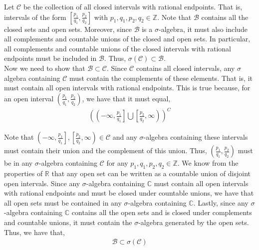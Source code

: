 \documentclass[12pt]{article}
\newenvironment{problem}[2][Problem]{\begin{trivlist}
\item[\hskip \labelsep {\bfseries #1}\hskip \labelsep {\bfseries #2.}]}{\end{trivlist}}
\begin{document}
\begin{problem}{5}
\end{problem}

Let $\mathcal{C}$ be the collection of all closed intervals with rational endpoints. That is, intervals of the form $\left[ \frac{p_1}{q_1}, \frac{p_2}{q_2} \right]$ with $p_1, q_1, p_2, q_2 \in \mathbb{Z}$. Note that $\mathcal{B}$ contains all the closed sets and open sets. Moreover, since $\mathcal{B}$ is a $\sigma$-algebra, it must also include all complements and countable unions of the closed and open sets. In particular, all complements and countable unions of the closed intervals with rational endpoints must be included in $\mathcal{B}$. Thus, $\sigma(\mathcal{C}) \subset \mathcal{B}$.\\

Now we need to show that $\mathcal{B} \subset \mathcal{C}$. Since $\mathcal{C}$ contains all closed intervals, any $\sigma$ algebra containing $\mathcal{C}$ must contain the complements of these elements. That is, it must contain all open intervals with rational endpoints. This is true because, for an open interval $\left( \frac{p_1}{q_1}, \frac{p_2}{q_2} \right)$, we have that it must equal,
\begin{align*}
\left(\left(-\infty, \frac{p_1}{q_1}\right] \bigcup \left[\frac{p_2}{q_2}, \infty\right)\right)^C
\end{align*}

Note that $\left(-\infty, \frac{p_1}{q_1}\right], \left[\frac{p_2}{q_2}, \infty\right) \in \mathcal{C}$ and any $\sigma$-algebra containing these intervals must contain their union and the complement of this union. Thus, $\left( \frac{p_1}{q_1}, \frac{p_2}{q_2} \right)$ must be in any $\sigma$-algebra containing $\mathcal{C}$ for any $p_1, q_1, p_2, q_2 \in \mathbb{Z}$. We know from the properties of $\mathbb{R}$ that any open set can be written as a countable union of disjoint open intervals. Since any $\sigma$-algebra containing $\mathbb{C}$ must contain all open intervals with rational endpoints and must be closed under countable unions, we have that all open sets must be contained in any $\sigma$-algebra containing $\mathbb{C}$. Lastly, since any $\sigma$-algebra containing $\mathbb{C}$ contains all the open sets and is closed under complements and countable unions, it must contain the $\sigma$-algebra generated by the open sets. Thus, we have that,
\begin{align*}
\mathcal{B} \subset \sigma(\mathcal{C})
\end{align*}
\end{document}
